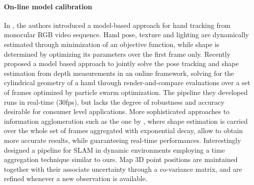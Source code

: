 \paragraph{On-line model calibration}
In \cite{delagorce2011model}, the authors introduced a model-based approach for hand tracking from monocular RGB video sequence. Hand pose, texture and lighting are dynamically estimated through minimization of an objective function, while shape is determined by optimizing its parameters over the first frame only. 
Recently \cite{makris2015model} proposed a model based approach to jointly solve the pose tracking and shape estimation from depth measurements in an online framework, solving for the cylindrical geometry of a hand through render-and-compare evaluations over a set of frames optimized by particle swarm optimization. The pipeline they developed runs in real-time (30fps), but lacks the degree of robustness and accuracy desirable for consumer level applications. 
More sophisticated approaches to information agglomeration such as the one by \cite{bouaziz2013online}, where shape estimation is carried over the whole set of frames aggregated with exponential decay, allow to obtain more accurate results, while guaranteeing real-time performances. 
Interestingly \cite{zou2013coslam} designed a pipeline for SLAM in dynamic environments employing a time aggregation technique similar to ours. Map 3D point positions are maintained together with their associate uncertainty through a co-variance matrix, and are refined whenever a new observation is available.

